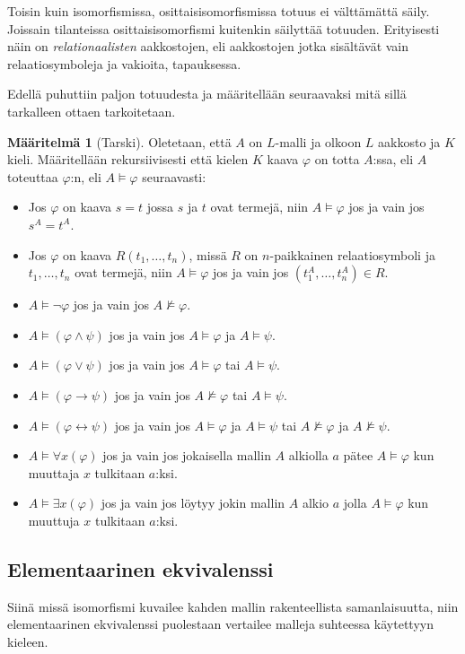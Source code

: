 \documentclass[finnish]{tktltiki2}
\theoremstyle{definition}
\newtheorem{maar}[lau]{Määritelmä}
\theoremstyle{remark}
\begin{document}
Toisin kuin isomorfismissa, osittaisisomorfismissa totuus ei välttämättä säily. Joissain tilanteissa osittaisisomorfismi kuitenkin säilyttää totuuden. Erityisesti näin on \textit{relationaalisten} aakkostojen, eli aakkostojen jotka sisältävät vain relaatiosymboleja ja vakioita, tapauksessa.

Edellä puhuttiin paljon totuudesta ja määritellään seuraavaksi mitä sillä tarkalleen ottaen tarkoitetaan.

\begin{maar}[Tarski]
Oletetaan, että $A$ on $L$-malli ja olkoon $L$ aakkosto ja $K$ kieli. Määritellään rekursiivisesti että kielen $K$ kaava $\varphi$ on totta $A$:ssa, eli $A$ toteuttaa $\varphi$:n, eli $A \models \varphi$ seuraavasti:
\begin{itemize}
\item Jos $\varphi$ on kaava $s = t$ jossa $s$ ja $t$ ovat termejä, niin $A \models \varphi$ jos ja vain jos $s^A = t^A$.
\item Jos $\varphi$ on kaava $R(t_1, \ldots, t_n)$, missä $R$ on $n$-paikkainen relaatiosymboli ja $t_1, \ldots, t_n$ ovat termejä, niin $A \models \varphi$ jos ja vain jos $(t_1^A, \ldots, t_n^A) \in R$.
\item $A \models \neg \varphi$ jos ja vain jos $A \not \models \varphi$.
\item $A \models (\varphi \land \psi)$ jos ja vain jos $A \models \varphi$ ja $A \models \psi$.
\item $A \models (\varphi \lor \psi)$ jos ja vain jos $A \models \varphi$ tai $A \models \psi$.
\item $A \models (\varphi \to \psi)$ jos ja vain jos $A \not \models \varphi$ tai $A \models \psi$.
\item $A \models (\varphi \leftrightarrow \psi)$ jos ja vain jos $A \models \varphi$ ja $A \models \psi$ tai $A \not \models \varphi$ ja $A \not \models \psi$.
\item $A \models \forall x(\varphi)$ jos ja vain jos jokaisella mallin $A$ alkiolla $a
$ pätee $A \models \varphi$ kun muuttaja $x$ tulkitaan $a$:ksi.
\item $A \models \exists x(\varphi)$ jos ja vain jos löytyy jokin mallin $A$ alkio $a$ jolla $A \models \varphi$ kun muuttuja $x$ tulkitaan $a$:ksi.
\end{itemize}
\end{maar}

\subsection{Elementaarinen ekvivalenssi}
Siinä missä isomorfismi kuvailee kahden mallin rakenteellista samanlaisuutta, niin elementaarinen ekvivalenssi puolestaan vertailee malleja suhteessa käytettyyn kieleen.
\end{document}
